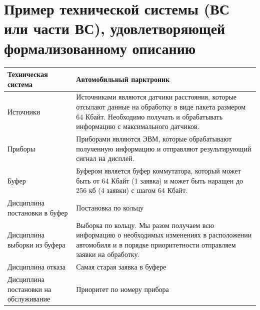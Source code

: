 \documentclass{article}
\begin{document}
	\section{Пример технической системы (ВС или части ВС), удовлетворяющей формализованному описанию}
	\centering
	\begin{tabular}{|p{5.2cm}|p{12cm}|}
		\hline
		Техническая система & Автомобильный парктроник\\ \hline
		Источники & Источниками являются датчики расстояния, которые отсылают данные на обработку в виде пакета размером 64 Кбайт. Необходимо получать и обрабатывать информацию с максимального датчиков. \\ \hline		
		Приборы	&Приборами являются ЭВМ, которые обрабатывают полученную информацию и отправляют результирующий сигнал на дисплей. \\ \hline	
		Буфер & Буфером является буфер коммутатора, который может быть от 64 Кбайт (1 заявка) и может быть наращен до 256 кб (4 заявки) с шагом 64 Кбайт. \\ \hline		
		Дисциплина постановки в буфер & Постановка по кольцу\\ \hline
		Дисциплина выборки из буфера & Выборка по кольцу. Мы разом получаем всю информацию о необходимых изменениях в расположении автомобиля и в порядке приоритетности отправляем заявки на обработку.\\ \hline
		Дисциплина отказа & Самая старая заявка в буфере\\ \hline
		Дисциплина постановки на обслуживание & Приоритет по номеру прибора\\ \hline
		
	\end{tabular} \\
	\flushleft
\end{document}
